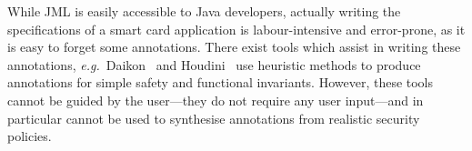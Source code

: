 


While JML is easily accessible to Java developers, actually writing
the specifications of a smart card application is labour-intensive and
error-prone, as it is easy to forget some annotations. There
exist tools which assist in writing these annotations,
\emph{e.g.}~Daikon~\cite{ErnstCGN01} and Houdini~\cite{FlanaganL01}
use heuristic methods to produce annotations for simple safety and
functional invariants.  However, these tools cannot be guided by the
user---they do not require any user input---and in particular cannot
be used to synthesise annotations from realistic security policies.


